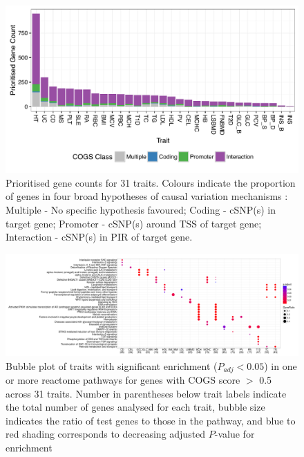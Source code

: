 \documentclass[a4paper,11pt]{report}
\begin{document}
\begin{landscape}

\begin{figure}[ht]
\centering
\includegraphics[]{all_trait_gene_counts.pdf}
\caption{Prioritised gene counts for 31 traits. Colours indicate the proportion of genes in four broad hypotheses of causal variation mechanisms : Multiple - No specific hypothesis favoured; Coding - cSNP(s) in target gene; Promoter - cSNP(s) around TSS of target gene; Interaction - cSNP(s) in PIR of target gene.}
\label{fig:31_trait_counts}
\end{figure}

\end{landscape}

\begin{landscape}
\begin{figure}[p]
\centering
\includegraphics[scale=0.5]{hyper_reactome_analysis_2.pdf}
\caption{Bubble plot of traits with significant enrichment ($P_{adj} < 0.05$) in one or more reactome pathways  for genes with COGS score $>$ 0.5 across 31 traits. Number in parentheses below trait labels indicate the total number of genes analysed for each trait, bubble size indicates the ratio of test genes to those in the pathway, and blue to red shading corresponds to decreasing adjusted $P$-value for enrichment}
\label{fig:reactome}
\end{figure}
\end{landscape}
\end{document}
